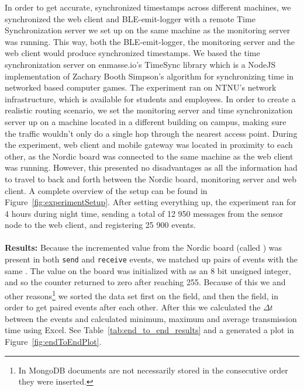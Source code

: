 In order to get accurate, synchronized timestamps across different machines, we synchronized the web client and BLE-emit-logger with a remote Time Synchronization server we set up on the same machine as the monitoring server was running. This way, both the BLE-emit-logger, the monitoring server and the web client would produce synchronized timestamps. We based the time synchronization server on enmasse.io's TimeSync library\cite{timesync} which is a NodeJS implementation of Zachary Booth Simpson's algorithm for synchronizing time in networked based computer games\cite{timesync:algo}. The experiment ran on NTNU's network infrastructure, which is available for students and employees. In order to create a realistic routing scenario, we set the monitoring server and time synchronization server up on a machine located in a different building on campus, making sure the traffic wouldn't only do a single hop through the nearest access point. During the experiment, web client and mobile gateway was located in proximity to each other, as the Nordic board was connected to the same machine as the web client was running. However, this presented no disadvantages as all the information had to travel to back and forth between the Nordic board, monitoring server and web client. A complete overview of the setup can be found in Figure~\ref{fig:experimentSetup}. After setting everything up, the experiment ran for 4 hours during night time, sending a total of 12 950 messages from the sensor node to the web client, and registering 25 900 events.
\\
\\
\noindent
\textbf{Results:} 
Because the incremented value from the Nordic board (called ) was present in both \texttt{send} and \texttt{receive} events, we matched up pairs of events with the same . The value on the board was initialized with as an 8 bit unsigned integer, and so the counter returned to zero after reaching 255. Because of this we and other reasons\footnote{In MongoDB documents are not necessarily stored in the consecutive order they were inserted.} we sorted the data set first on the  field, and then the  field, in order to get paired events after each other. After this we calculated the $\Delta t$ between the events and calculated minimum, maximum and average transmission time using Excel. See Table~\ref{tab:end_to_end_results} and a generated a plot in Figure~\ref{fig:endToEndPlot}.

